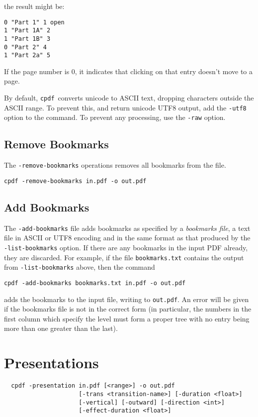 \documentclass{book}
\newcommand{\cpdf}{\texttt{cpdf}}
\begin{document}
\noindent the result might be:
\begin{framed}{\small\begin{verbatim}
0 "Part 1" 1 open
1 "Part 1A" 2
1 "Part 1B" 3
0 "Part 2" 4
1 "Part 2a" 5\end{verbatim}}\end{framed}
\noindent If the page number is 0, it indicates that clicking on that entry doesn't move to a page.

By default, \cpdf\ converts unicode to ASCII text, dropping characters outside
the ASCII range. To prevent this, and return unicode UTF8 output, add the
\texttt{-utf8} option to the command. To prevent any processing, use the
\texttt{-raw} option.

  \section{Remove Bookmarks}
  \label{removebookmarks}
  The \texttt{-remove-bookmarks} operations removes all bookmarks from the file.
  \begin{framed}
    \small\verb!cpdf -remove-bookmarks in.pdf -o out.pdf!
  \end{framed}

  \section{Add Bookmarks}
  
  The \texttt{-add-bookmarks} file adds bookmarks as specified by a
\textit{bookmarks file}, a text file in ASCII or UTF8 encoding and in the same format as that produced by the
\texttt{-list-bookmarks} option. If there are any bookmarks in the input PDF
already, they are discarded. For example, if the file \texttt{bookmarks.txt}
contains the output from \texttt{-list-bookmarks} above, then the command
  \begin{framed}
   \small\verb!cpdf -add-bookmarks bookmarks.txt in.pdf -o out.pdf!
  \end{framed}
\noindent adds the bookmarks to the input file, writing to \texttt{out.pdf}. An error
will be given if the bookmarks file is not in the correct form (in particular,
the numbers in the first column which specify the level must form a proper
tree with no entry being more than one greater than the last).

\chapter{Presentations}
  \begin{framed}
  \small\noindent\begin{verbatim}
  cpdf -presentation in.pdf [<range>] -o out.pdf
                     [-trans <transition-name>] [-duration <float>]
                     [-vertical] [-outward] [-direction <int>]
                     [-effect-duration <float>]\end{verbatim}
\end{framed}
\end{document}
